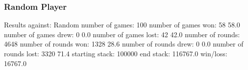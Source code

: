 \subsubsection{Random Player}
Results against:              Random                        
number of games:              100                           
number of games won:          58                            58.0%
number of games drew:         0                             0.0%
number of games lost:         42                            42.0%
number of rounds:             4648                          
number of rounds won:         1328                          28.6%
number of rounds drew:        0                             0.0%
number of rounds lost:        3320                          71.4%
starting stack:               100000                        
end stack:                    116767.0                      
win/loss:                     16767.0 

